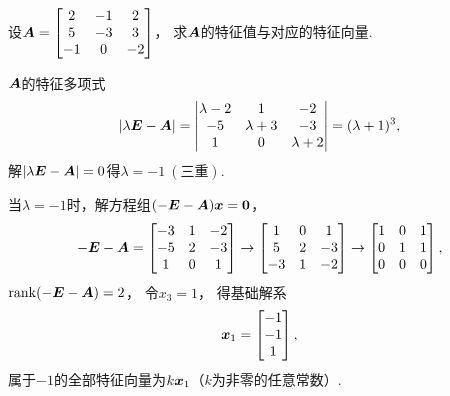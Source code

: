 \begin{example}
设\(\boldsymbol{A} = \begin{bmatrix} 2 & -1 & 2 \\ 5 & -3 & 3 \\ -1 & 0 & -2 \end{bmatrix}\)，
求\(\boldsymbol{A}\)的特征值与对应的特征向量.
\begin{solution}
\(\boldsymbol{A}\)的特征多项式\[
	\abs{\lambda\boldsymbol{E}-\boldsymbol{A}}
	= \begin{vmatrix}
		\lambda-2 & 1 & -2 \\
		-5 & \lambda+3 & -3 \\
		1 & 0 & \lambda+2
	\end{vmatrix}
	= (\lambda+1)^3,
\]
解\(\abs{\lambda\boldsymbol{E}-\boldsymbol{A}}=0\)得\(\lambda=-1\ (\text{三重})\).

当\(\lambda=-1\)时，解方程组\((-\boldsymbol{E}-\boldsymbol{A})\boldsymbol{x}=\boldsymbol0\)，\[
	-\boldsymbol{E}-\boldsymbol{A} = \begin{bmatrix} -3 & 1 & -2 \\ -5 & 2 & -3 \\ 1 & 0 & 1 \end{bmatrix}
	\to \begin{bmatrix} 1 & 0 & 1 \\ 5 & 2 & -3 \\ -3 & 1 & -2 \end{bmatrix}
	\to \begin{bmatrix} 1 & 0 & 1 \\ 0 & 1 & 1 \\ 0 & 0 & 0 \end{bmatrix},
\]
\(\rank(-\boldsymbol{E}-\boldsymbol{A})=2\)，
令\(x_3=1\)，
得基础解系\[
	\boldsymbol{x}_1=\begin{bmatrix} -1 \\ -1 \\ 1 \end{bmatrix},
\]
属于\(-1\)的全部特征向量为\(k\boldsymbol{x}_1\)（\(k\)为非零的任意常数）.
\end{solution}
\end{example}

